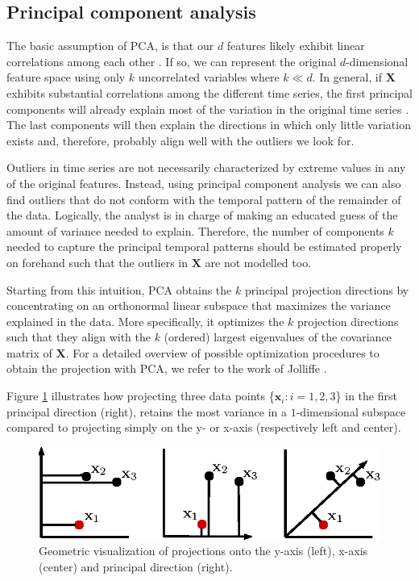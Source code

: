 \subsection{Principal component analysis}

The basic assumption of PCA, is that our $d$ features likely exhibit linear correlations among each other \cite{aggarwal2015outlier}. If so, we can represent the original $d$-dimensional feature space using only $k$ uncorrelated variables where $k \ll d$. In general, if $\mathbf{X}$ exhibits substantial correlations among the different time series, the first principal components will already explain most of the variation in the original time series \cite{jolliffe1986principal}. The last components will then explain the directions in which only little variation exists and, therefore, probably align well with the outliers we look for.

Outliers in time series are not necessarily characterized by extreme values in any of the original features. Instead, using principal component analysis we can also find outliers that do not conform with the temporal pattern of the remainder of the data. Logically, the analyst is in charge of making an educated guess of the amount of variance needed to explain. Therefore, the number of components $k$ needed to capture the principal temporal patterns should be estimated properly on forehand such that the outliers in $\mathbf{X}$ are not modelled too.

Starting from this intuition, PCA obtains the $k$ principal projection directions by concentrating on an orthonormal linear subspace that maximizes the variance explained in the data. More specifically, it optimizes the $k$ projection directions such that they align with the $k$ (ordered) largest eigenvalues of the covariance matrix of $\mathbf{X}$. For a detailed overview of possible optimization procedures to obtain the projection with PCA, we refer to the work of Jolliffe \cite{jolliffe1986principal}. 

Figure \ref{fig:reconstruction_geometry_projections} illustrates how projecting three data points \{$\mathbf{x}_i : i = 1,2,3$\} in the first principal direction (right), retains the most variance in a $1$-dimensional subspace compared to projecting simply on the y- or x-axis (respectively left and center). 

\begin{figure}[!h]
	\centering
	\includegraphics[scale=1.8]{reconstruction-detection/geometry_projections_pca1}
	\caption{Geometric visualization of projections onto the y-axis (left), x-axis (center) and principal direction (right).}
	\label{fig:reconstruction_geometry_projections}
\end{figure}

